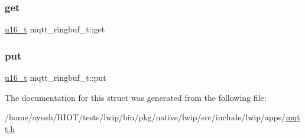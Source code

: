\mbox{\label{structmqtt__ringbuf__t_aa403cea9ffc2f3a780591bf8d5482054}} 
\subsubsection{\texorpdfstring{get}{get}}
{\footnotesize\ttfamily \hyperlink{group__compiler__abstraction_ga77570ac4fcab86864fa1916e55676da2}{u16\+\_\+t} mqtt\+\_\+ringbuf\+\_\+t\+::get}

\mbox{\label{structmqtt__ringbuf__t_af2d228ca682741a29621e9592536fa39}} 
\subsubsection{\texorpdfstring{put}{put}}
{\footnotesize\ttfamily \hyperlink{group__compiler__abstraction_ga77570ac4fcab86864fa1916e55676da2}{u16\+\_\+t} mqtt\+\_\+ringbuf\+\_\+t\+::put}



The documentation for this struct was generated from the following file\+:\begin{DoxyCompactItemize}
\item 
/home/ayush/\+R\+I\+O\+T/tests/lwip/bin/pkg/native/lwip/src/include/lwip/apps/\hyperlink{native_2lwip_2src_2include_2lwip_2apps_2mqtt_8h}{mqtt.\+h}\end{DoxyCompactItemize}
